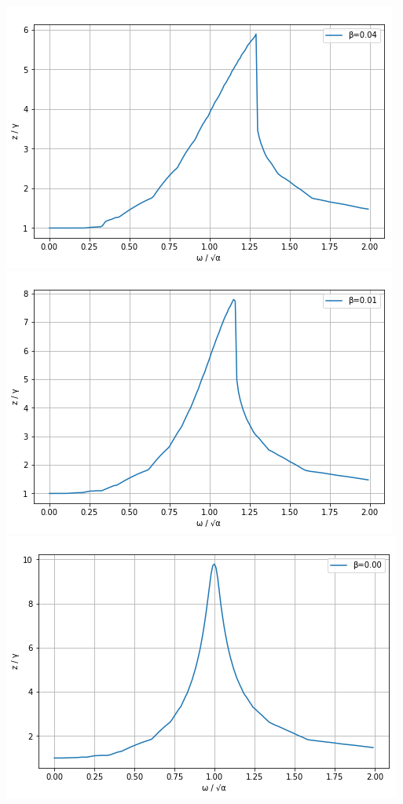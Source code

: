 \documentclass{article}
\begin{document}
\begin{center}
    \includegraphics[scale = 0.4]{04.png}
    \includegraphics[scale = 0.4]{01.png}
    \includegraphics[scale = 0.4]{00.png}

\end{center}
\end{document}
